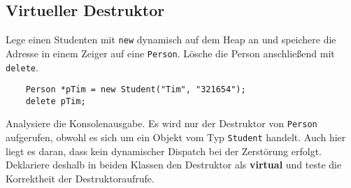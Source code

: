 \subsection{Virtueller Destruktor}
Lege einen Studenten mit \texttt{new} dynamisch auf dem Heap an und speichere die Adresse in einem Zeiger auf eine \texttt{Person}.
Lösche die Person anschließend mit \texttt{delete}.

\begin{lstlisting}
	Person *pTim = new Student("Tim", "321654");
	delete pTim;
\end{lstlisting}

Analysiere die Konsolenausgabe.
Es wird nur der Destruktor von \texttt{Person} aufgerufen, obwohl es sich um ein Objekt vom Typ \texttt{Student} handelt.
Auch hier liegt es daran, dass kein dynamischer Dispatch bei der Zerstörung erfolgt.
Deklariere deshalb in beiden Klassen den Destruktor als \textbf{virtual} und teste die Korrektheit der Destruktoraufrufe.

